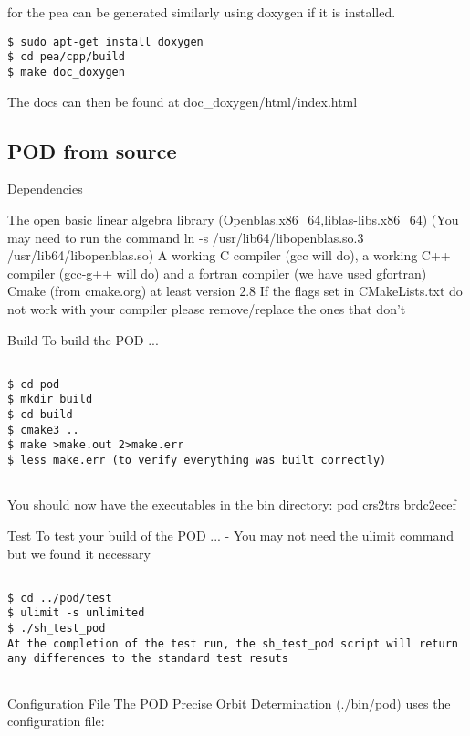  for the pea can be generated similarly using doxygen if it is installed.

\begin{verbatim}
$ sudo apt-get install doxygen
$ cd pea/cpp/build
$ make doc_doxygen
\end{verbatim}
The docs can then be found at doc\_doxygen/html/index.html

\subsection{POD from source}



Dependencies

The open basic linear algebra library (Openblas.x86\_64,liblas-libs.x86\_64) (You may need to run the command ln -s /usr/lib64/libopenblas.so.3 /usr/lib64/libopenblas.so)
A working C compiler (gcc will do), a working C++ compiler (gcc-g++ will do) and a fortran compiler (we have used gfortran)
Cmake (from cmake.org) at least version 2.8
If the flags set in CMakeLists.txt do not work with your compiler please remove/replace the ones that don't

Build
To build the POD ...
\begin{verbatim}

$ cd pod
$ mkdir build
$ cd build
$ cmake3 .. 
$ make >make.out 2>make.err
$ less make.err (to verify everything was built correctly)
    
\end{verbatim}
You should now have the executables in the bin directory: pod crs2trs brdc2ecef

Test
To test your build of the POD ... - You may not need the ulimit command but we found it necessary

\begin{verbatim}

$ cd ../pod/test
$ ulimit -s unlimited
$ ./sh_test_pod
At the completion of the test run, the sh_test_pod script will return any differences to the standard test resuts
    
\end{verbatim}

Configuration File
The POD Precise Orbit Determination (./bin/pod) uses the configuration file: 


%
